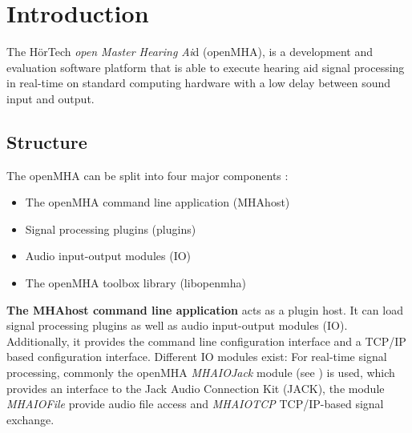 \section{Introduction}
The H\"{o}rTech \emph{open Master Hearing Ai}d (openMHA), is a development and evaluation software platform that is able to execute hearing aid signal processing in real-\/time on standard computing hardware with a low delay between sound input and output.

\subsection{Structure}\label{index_str}
The openMHA can be split into four major components :
\begin{itemize}
\item The openMHA command line application (MHAhost)
\item Signal processing plugins (plugins)
\item Audio input-\/output modules (IO)
\item The openMHA toolbox library (libopenmha)
\end{itemize} 

{\bf The MHAhost command line application} acts as a plugin host. It can load signal processing plugins as well as audio input-\/output modules (IO). Additionally, it provides the command line configuration interface and a TCP/IP based configuration interface. Different IO modules exist: For real-\/time signal processing, commonly the openMHA \emph{MHAIOJack} module (see \PluginManual) is used, which provides an interface to the Jack Audio Connection Kit (JACK), the module \emph{MHAIOFile} provide audio file access and \emph{MHAIOTCP} TCP/IP-\/based signal exchange.

